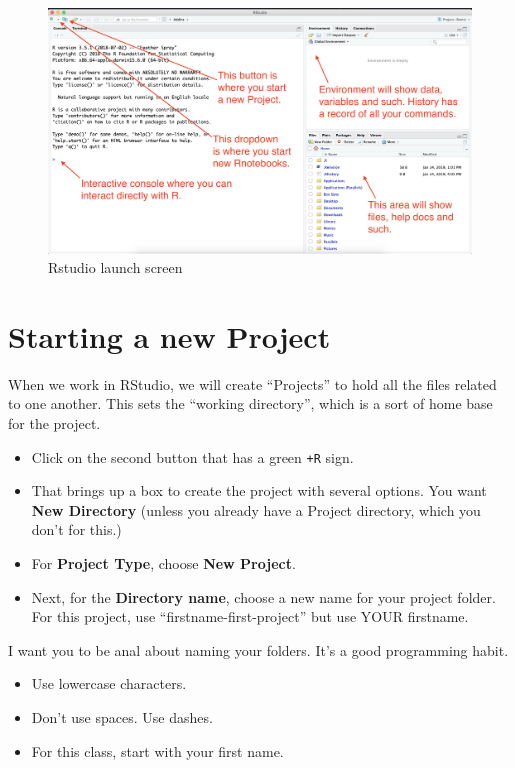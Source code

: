\documentclass[]{book}
\providecommand{\tightlist}{%
  \setlength{\itemsep}{0pt}\setlength{\parskip}{0pt}}
\begin{document}
\begin{figure}
\centering
\includegraphics[width=1.00000\textwidth]{images/intro-start.png}
\caption{Rstudio launch screen}
\end{figure}

\section{Starting a new Project}\label{starting-a-new-project}

When we work in RStudio, we will create ``Projects'' to hold all the
files related to one another. This sets the ``working directory'', which
is a sort of home base for the project.

\begin{itemize}
\tightlist
\item
  Click on the second button that has a green \texttt{+R} sign.
\item
  That brings up a box to create the project with several options. You
  want \textbf{New Directory} (unless you already have a Project
  directory, which you don't for this.)
\item
  For \textbf{Project Type}, choose \textbf{New Project}.
\item
  Next, for the \textbf{Directory name}, choose a new name for your
  project folder. For this project, use ``firstname-first-project'' but
  use YOUR firstname.
\end{itemize}

I want you to be anal about naming your folders. It's a good programming
habit.

\begin{itemize}
\tightlist
\item
  Use lowercase characters.
\item
  Don't use spaces. Use dashes.
\item
  For this class, start with your first name.
\end{itemize}
\end{document}
